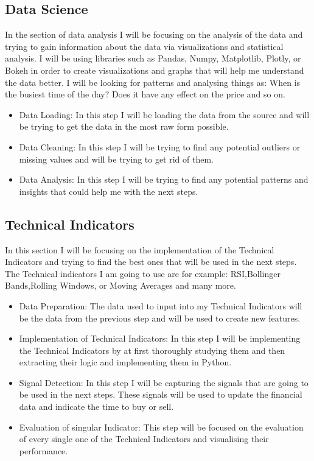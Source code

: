 \documentclass{imc-inf}
\begin{document}
	\subsection{Data Science}
	In the section of data analysis I will be focusing on the analysis of the data and trying to gain information about 
	the data via visualizations and statistical analysis. I will be using libraries such as Pandas, Numpy, Matplotlib, Plotly, or Bokeh 
	in order to create visualizations and graphs that will help me understand the data better. I will be looking for patterns and analysing things as:
	When is the busiest time of the day? Does it have any effect on the price and so on.
	\begin{itemize}
		\item Data Loading: In this step I will be loading the data from the source and will be trying to get the data in the most raw form possible.
		\item Data Cleaning: In this step I will be trying to find any potential outliers or missing values and will be trying to get rid of them.
		\item  Data Analysis: In this step I will be trying to find any potential patterns and insights that could help me with the next steps.
	\end{itemize}

	\subsection{Technical Indicators}
	In this section I will be focusing on the implementation of the Technical Indicators and trying to find the best ones that will be used in the next steps.
	The Technical indicators I am going to use are for example: RSI,Bollinger Bands,Rolling Windows, or Moving Averages and many more.
	\begin{itemize}
		\item Data Preparation: The data used to input into my Technical Indicators will be the data from the previous step and will be used to create new features.
		\item Implementation of Technical Indicators: In this step I will be implementing the Technical Indicators by at first thoroughly studying them and then extracting 
		their logic and implementing them in Python. 
		\item Signal Detection: In this step I will be capturing the signals that are going to be used in the next steps. These signals will be used to update the financial data and indicate the time to buy or sell.
		\item Evaluation of singular Indicator: This step will be focused on the evaluation of every single one of the Technical Indicators and visualising their performance.
	\end{itemize}
\end{document}
